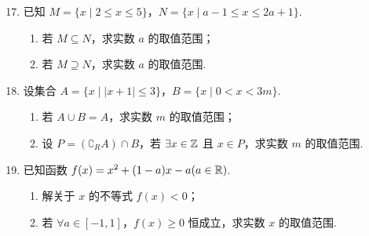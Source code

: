 
\begin{enumerate}
\setcounter{enumi}{16}

\item 已知 $M=\{x\mid2\leqslant x\leqslant5\}$，$N=\{x\mid a-1\leqslant x\leqslant2a+1\}$.
\begin{enumerate}[label=(\arabic*)]
\item 若 $M\subseteq N$，求实数 $a$ 的取值范围；
\item 若 $M\supseteq N$，求实数 $a$ 的取值范围.
\end{enumerate}

\ifanswer
{}
\fi

\ansspace[6]

\item 设集合 $A=\{x\mid|x+1|\leqslant3\}$，$B=\{x\mid0<x<3m\}$.
\begin{enumerate}[label=(\arabic*)]
\item 若 $A\cup B=A$，求实数 $m$ 的取值范围；
\item 设 $P=(\complement_R A)\cap B$，若 $\exists x\in\mathbb{Z}$ 且 $x\in P$，求实数 $m$ 的取值范围.
\end{enumerate}

\ifanswer
\solbegin
{}
\step{则实数 $m$ 的取值范围是 $\left(-\infty,\dfrac23\right]$.}
\solend

\fi

\ansspace[7]

\item 已知函数 $f(x)=x^2+(1-a)x-a(a\in\mathbb{R})$.
\begin{enumerate}[label=(\arabic*)]
\item 解关于 $x$ 的不等式 $f(x)<0$；
\item 若 $\forall a\in[-1,1]$，$f(x)\geqslant0$ 恒成立，求实数 $x$ 的取值范围.
\end{enumerate}


\end{enumerate}
